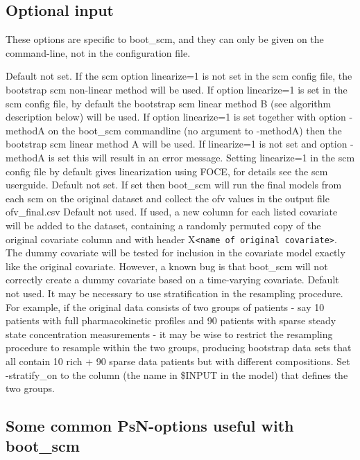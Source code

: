 \subsection{Optional input}
These options are specific to boot\_scm, and they can only be given on the command-line, not in the configuration file.
\begin{optionlist}
Default not set. If the scm option linearize=1 is not set in the scm config file, 
the bootstrap scm non-linear method will be used. If option linearize=1 is set in the scm config file, 
by default the bootstrap scm linear method B (see algorithm description below) will be used. 
If option linearize=1 is set  together with option -methodA on the boot\_scm commandline (no argument to -methodA) 
then the bootstrap scm linear method A will be used. If linearize=1 
is not set and option -methodA is set this will result in an error message.  
Setting linearize=1 in the scm config file by default gives linearization using FOCE, for details see the
scm userguide.
\nextopt
{}
Default not set. If set then boot\_scm will run the final models from each scm on the original dataset and collect the ofv values 
in the output file ofv\_final.csv   
\nextopt
{}
Default not used. If used, a new column for each listed covariate will be added to the dataset, 
containing a randomly permuted copy of the original covariate column and with header X\verb|<name of original covariate>|. 
The dummy covariate will be tested for inclusion in the covariate model exactly like the original covariate. 
However, a known bug is that boot\_scm will not correctly create a 
dummy covariate based on a time-varying covariate.
\nextopt
{}
Default not used. It may be necessary to use stratification in the resampling procedure. For example, if the original data consists of two groups of patients - say 10 patients with full pharmacokinetic profiles and 90 patients with sparse steady state concentration measurements - it may be wise to restrict the resampling procedure to resample within the two groups, producing bootstrap data sets that all contain 10 rich + 90 sparse data patients but with different compositions. 
Set -stratify\_on to the column (the name in \$INPUT in the model) that defines the two groups.
\nextopt
\end{optionlist}


\subsection{Some common PsN-options useful with boot\_scm}

